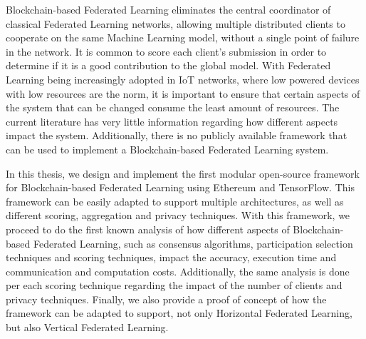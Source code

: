 Blockchain-based Federated Learning eliminates the central coordinator of classical Federated Learning networks, allowing multiple distributed clients to cooperate on the same Machine Learning model, without a single point of failure in the network. It is common to score each client's submission in order to determine if it is a good contribution to the global model. With Federated Learning being increasingly adopted in IoT networks, where low powered devices with low resources are the norm, it is important to ensure that certain aspects of the system that can be changed consume the least amount of resources. The current literature has very little information regarding how different aspects impact the system. Additionally, there is no publicly available framework that can be used to implement a Blockchain-based Federated Learning system.

In this thesis, we design and implement the first modular open-source framework for Blockchain-based Federated Learning using Ethereum and TensorFlow. This framework can be easily adapted to support multiple architectures, as well as different scoring, aggregation and privacy techniques. With this framework, we proceed to do the first known analysis of how different aspects of Blockchain-based Federated Learning, such as consensus algorithms, participation selection techniques and scoring techniques, impact the accuracy, execution time and communication and computation costs. Additionally, the same analysis is done per each scoring technique regarding the impact of the number of clients and privacy techniques. Finally, we also provide a proof of concept of how the framework can be adapted to support, not only Horizontal Federated Learning, but also Vertical Federated Learning.